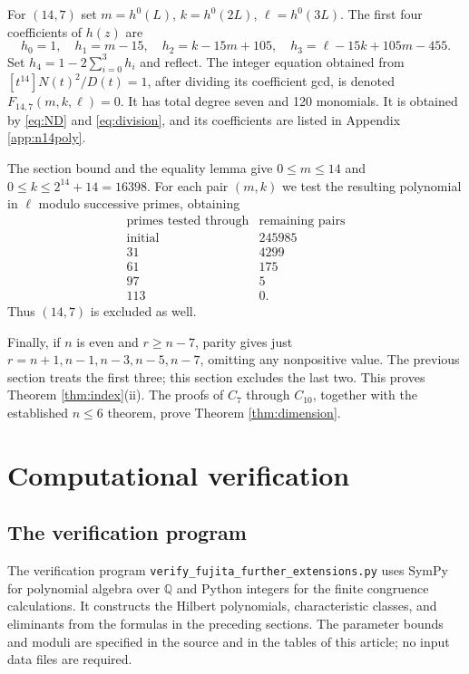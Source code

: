\documentclass[11pt,reqno,letterpaper]{amsart}
\newcommand{\Q}{\mathbb Q}
\theoremstyle{definition}
\numberwithin{equation}{section}
\begin{document}
For $(14,7)$ set $m=h^0(L)$, $k=h^0(2L)$, $\ell=h^0(3L)$.
The first four coefficients of $h(z)$ are
\[
 h_0=1,\quad h_1=m-15,\quad h_2=k-15m+105,\quad
 h_3=\ell-15k+105m-455.
\]
Set $h_4=1-2\sum_{i=0}^3h_i$ and reflect.
The integer equation obtained from
$[t^{14}]N(t)^2/D(t)=1$, after dividing its coefficient gcd,
is denoted $F_{14,7}(m,k,\ell)=0$. It has total degree seven and 120
monomials. It is obtained by \eqref{eq:ND} and \eqref{eq:division}, and its
coefficients are listed in
Appendix \ref{app:n14poly}.

The section bound and the equality lemma give
$0\le m\le14$ and $0\le k\le2^{14}+14=16398$.
For each pair $(m,k)$ we test the resulting polynomial in $\ell$
modulo successive primes, obtaining
\[
\begin{array}{r|r}
\text{primes tested through}&\text{remaining pairs}\\ \hline
\text{initial}&245985\\31&4299\\61&175\\97&5\\113&0.
\end{array}
\]
Thus $(14,7)$ is excluded as well.

Finally, if $n$ is even and $r\ge n-7$, parity gives just
$r=n+1,n-1,n-3,n-5,n-7$, omitting any nonpositive value.
The previous section treats the first three; this section excludes the last
two. This proves Theorem \ref{thm:index}\textup{(ii)}.
The proofs of $C_7$ through $C_{10}$, together with the established
$n\le6$ theorem, prove Theorem \ref{thm:dimension}.

\section{Computational verification}\label{sec:python}

\subsection{The verification program}

The verification program
\nolinkurl{verify_fujita_further_extensions.py} uses SymPy for
polynomial algebra over $\Q$ and Python integers for the finite
congruence calculations. It constructs the Hilbert polynomials,
characteristic classes, and eliminants from the formulas in the
preceding sections. The parameter bounds and moduli are specified in
the source and in the tables of this article; no input data files
are required.
\end{document}
